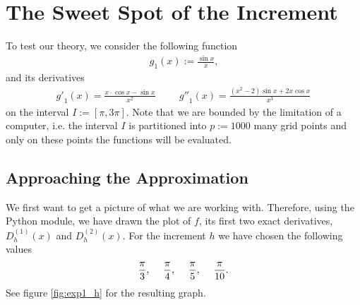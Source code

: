 \section{The Sweet Spot of the Increment}
To test our theory, we consider the following function
\begin{align*}
    g_1(x) := \frac{\sin{x}}{x} \text{,}
\end{align*}
and its derivatives
\begin{align*}
    {g'}_{1}(x) = \frac{x \cdot \cos{x} - \sin{x}}{x^2} \hspace{1cm} {g''}_{1}(x) = \frac{(x^2 - 2) \sin{x} + 2 x \cos{x}}{x^3} \text{}
\end{align*}
on the interval \(I := [\pi, 3\pi]\). Note that we are bounded by the limitation of a computer, i.e. the interval \(I\) is partitioned into \(p := 1000\) many grid points and only on these points the functions will be evaluated.


\subsection{Approaching the Approximation} %

We first want to get a picture of what we are working with. Therefore, using the Python module, we have drawn the plot of \(f\), its first two exact derivatives, \(D^{(1)}_h(x)\) and \(D^{(2)}_h(x)\). For the increment \(h\) we have chosen the following values
\begin{align*}
    \frac{\pi}{3} \text{,} \hspace{0.5cm} \frac{\pi}{4} \text{,} \hspace{0.5cm} \frac{\pi}{5} \text{,} \hspace{0.5cm} \frac{\pi}{10} \text{.}
\end{align*}
See figure \ref{fig:exp1_h} for the resulting graph.

